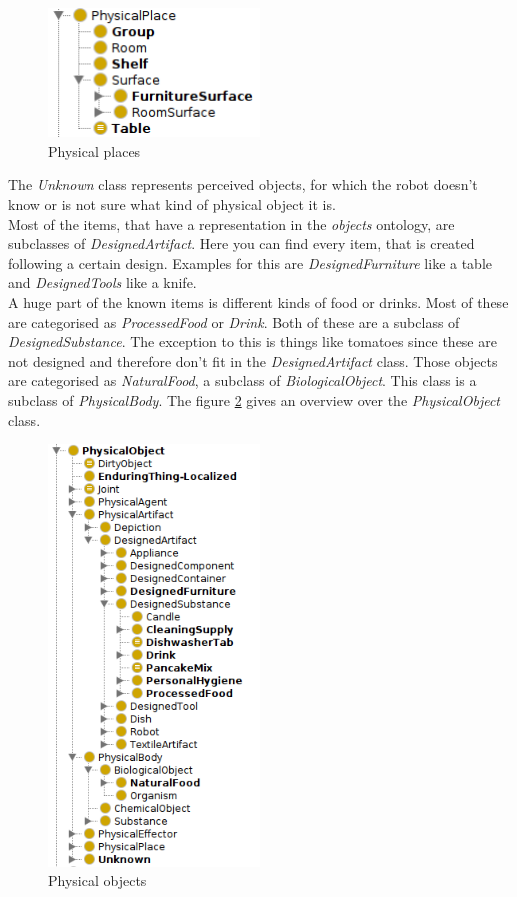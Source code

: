 \documentclass[main.tex]{subfiles}
\begin{document}
\begin{figure}
\centering
\includegraphics[width=0.5\textwidth]{pictures/ontology/Ontologie_place}
\caption{Physical places}
\label{fig:place_ont}
\end{figure}

The \textit{Unknown} class represents perceived objects, for which the robot doesn't know or is not sure what kind of physical object it is.\\
Most of the items, that have a representation in the \textit{objects} ontology, are subclasses of \textit{DesignedArtifact}.
Here you can find every item, that is created following a certain design. 
Examples for this are \textit{DesignedFurniture} like a table and \textit{DesignedTools} like a knife.\\
A huge part of the known items is different kinds of food or drinks. Most of these are categorised as \textit{ProcessedFood} or \textit{Drink}. Both of these are a subclass of \textit{DesignedSubstance}. The exception to this is things like tomatoes since these are not designed and therefore don't fit in the \textit{DesignedArtifact} class. Those objects are categorised as \textit{NaturalFood}, a subclass of \textit{BiologicalObject}. This class is a subclass of \textit{PhysicalBody}. The figure \ref{fig:object_ont} gives an overview over the \textit{PhysicalObject} class.

\begin{figure}
\centering
\includegraphics[width=0.5\textwidth]{pictures/ontology/Ontologie_objects}
\caption{Physical objects}
\label{fig:object_ont}
\end{figure}
\end{document}
